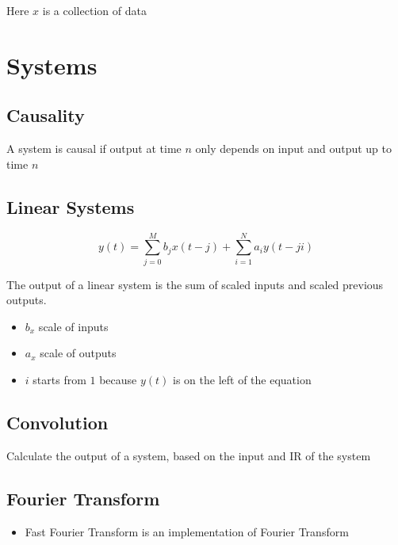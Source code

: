   Here $ x $ is a collection of data

\section{Systems}

  \subsection{Causality}

    A system is causal if output at time $ n $ only depends on input and output
    up to time $ n $

  \subsection{Linear Systems}

    \begin{equation}
      y\left( t \right) =
        \sum_{j = 0}^{M} b_{j} x\left( t - j \right)
        + \sum_{i = 1}^{N} a_{i} y\left( t - ji \right)
    \end{equation}

    The output of a linear system is the sum of scaled inputs and
    scaled previous outputs.

    \begin{itemize}
      \item $ b_{x} $ scale of inputs
      \item $ a_{x} $ scale of outputs
      \item $ i $ starts from $ 1 $ because $ y\left( t \right) $ is on the left
      of the equation
    \end{itemize}

  \subsection{Convolution}

    Calculate the output of a system, based on the input and IR of the system

  \subsection{Fourier Transform}

    \begin{itemize}
      \item Fast Fourier Transform is an implementation of Fourier Transform
    \end{itemize}
